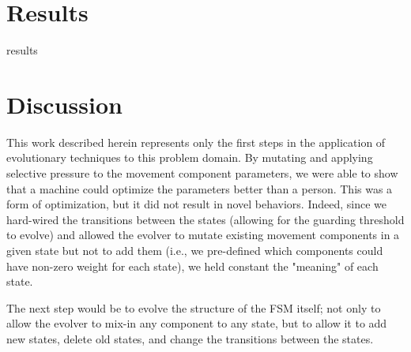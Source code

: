 \documentclass[12pt,journal,compsoc]{IEEEtran}
\begin{document}
\section{Results}
results

\section{Discussion}
This work described herein represents only the first steps in the application of evolutionary techniques to this problem domain. By mutating and applying selective pressure to the movement component parameters, we were able to show that a machine could optimize the parameters better than a person. This was a form of optimization, but it did not result in novel behaviors. Indeed, since we hard-wired the transitions between the states (allowing for the guarding threshold to evolve) and allowed the evolver to mutate existing movement components in a given state but not to add them (i.e., we pre-defined which components could have non-zero weight for each state), we held constant the "meaning" of each state.

The next step would be to evolve the structure of the FSM itself; not only to allow the evolver to mix-in any component to any state, but to allow it to add new states, delete old states, and change the transitions between the states.



\end{document}
